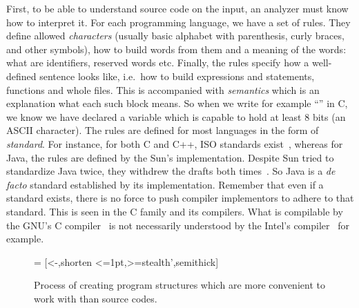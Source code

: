 First, to be able to understand source code on the input, an analyzer must
know how to interpret it. For each programming language, we have a set of
rules. They define allowed \emph{characters} (usually basic alphabet with
parenthesis, curly braces, and other symbols), how to build words from them
and a meaning of the words: what are identifiers, reserved words etc. Finally,
the rules specify how a well-defined sentence looks like, i.e.\ how to build
expressions and statements, functions and whole files. This is accompanied
with \emph{semantics} which is an explanation what each such block means. So
when we write for example ``'' in C, we know we have declared a
variable which is capable to hold at least 8 bits (an ASCII character).  The
rules are defined for most languages in the form of \emph{standard}. For
instance, for both C and C++, ISO standards exist~\cite{ansi_c, ansi_cpp},
whereas for Java, the rules are defined by the Sun's implementation. Despite
Sun tried to standardize Java twice, they withdrew the drafts both
times~\cite{java_non_std}. So Java is a \emph{de facto} standard established
by its implementation.  Remember that even if a standard exists, there is no
force to push compiler implementors to adhere to that standard. This is seen
in the C family and its compilers. What is compilable by the GNU's C
compiler~\cite{gcc} is not necessarily understood by the Intel's
compiler~\cite{intel_cc} for example.

\begin{figure}[tb]
\begin{center}
     = [<-,shorten <=1pt,>=stealth',semithick]
\end{center}
    \caption{Process of creating program structures which are more convenient
    to work with than source codes.}
  \label{fig:parsing_process}
\end{figure}

